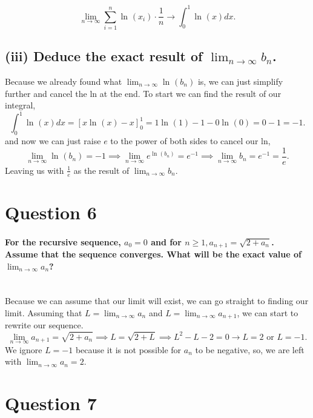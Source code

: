 \[
\lim_{ n \to \infty} \sum_{ i=1 } ^{ n } \ln^{  } \left( x_i \right) \cdot \frac{ 1 }{ n } \to \int_{ 0 }^{ 1 } \ln^{  } \left( x \right) dx
.\] 

\subsection*{(iii) Deduce the exact result of $ \lim_{ n \to \infty} b_n $.}%
Because we already found what $ \lim_{ n \to \infty} \ln^{  } \left( b_n \right)  $ is, we can just simplify further and cancel the ln at the end. To start we can find the result of our integral,
\[
\int_{ 0 }^{ 1 } \ln^{  } \left( x \right) dx = \left[ x\ln^{  } \left( x \right) -x \right] _{ 0 }^{ 1 } = 1\ln^{  } \left( 1 \right) -1-0\ln^{  } \left( 0 \right) = 0-1 = -1
.\] 
and now we can just raise $ e $ to the power of both sides to cancel our ln,
\[
\lim_{ n \to \infty} \ln^{  } \left( b_n \right) = -1 \implies \lim_{ n \to \infty} e^{ \ln^{  } \left( b_n \right)  }=e^{ -1 } \implies \lim_{ n \to \infty} b_n = e^{ -1 } = \frac{ 1 }{ e } 
.\] 
Leaving us with $ \frac{ 1 }{ e }  $ as the result of $ \lim_{ n \to \infty} b_n $.
\newpage
\section*{Question 6}%
\paragraph{For the recursive sequence, $ a_0 =0$ and for $ n\ge 1, a_{ n+1 }=\sqrt{ 2+ a_n} $. Assume that the sequence converges. What will be the exact value of $ \lim_{ n \to \infty} a_{ n } $? \\ \\ }
Because we can assume that our limit will exist, we can go straight to finding our limit. Assuming that $ L=\lim_{ n \to \infty} a_n $ and $ L=\lim_{ n \to \infty} a_{ n+1 } $, we can start to rewrite our sequence. 
\[
\lim_{ n \to \infty} a_{ n+1 } = \sqrt{ 2+a_n} \implies L = \sqrt{ 2+L } \implies L^2-L-2= 0 \to L=2 \text{ or } L=-1
.\] 
We ignore $ L=-1 $ because it is not possible for $ a_n $ to be negative, so, we are left with $ \lim_{ n \to \infty} a_n =2 $.

\section*{Question 7}%
